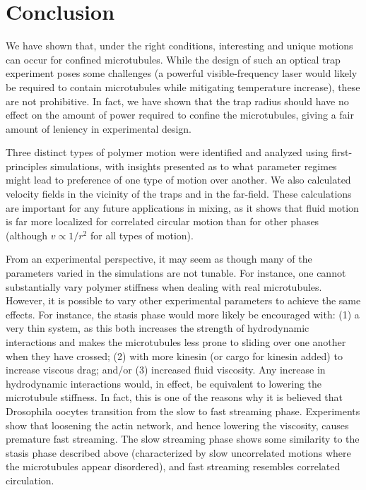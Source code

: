 \documentclass[11pt]{ucthesis}
\begin{document}
\section{Conclusion}

We have shown that, under the right conditions, interesting and unique motions can occur for confined microtubules. While the design of such an optical trap experiment poses some challenges (a powerful visible-frequency laser would likely be required to contain microtubules while mitigating temperature increase), these are not prohibitive. In fact, we have shown that the trap radius should have no effect on the amount of power required to confine the microtubules, giving a fair amount of leniency in experimental design.

Three distinct types of polymer motion were identified and analyzed using first-principles simulations, with insights presented as to what parameter regimes might lead to preference of one type of motion over another. We also calculated velocity fields in the vicinity of the traps and in the far-field. These calculations are important for any future applications in mixing, as it shows that fluid motion is far more localized for correlated circular motion than for other phases (although $v\propto 1/r^2$ for all types of motion).

From an experimental perspective, it may seem as though many of the parameters varied in the simulations are not tunable. For instance, one cannot substantially vary polymer stiffness when dealing with real microtubules. However, it is possible to vary other experimental parameters to achieve the same effects. For instance, the stasis phase would more likely be encouraged with: (1) a very thin system, as this both increases the strength of hydrodynamic interactions and makes the microtubules less prone to sliding over one another when they have crossed; (2) with more kinesin (or cargo for kinesin added) to increase viscous drag; and/or (3) increased fluid viscosity. Any increase in hydrodynamic interactions would, in effect, be equivalent to lowering the microtubule stiffness. In fact, this is one of the reasons why it is believed that Drosophila oocytes transition from the slow to fast streaming phase. Experiments \cite{serbus2005dynein} show that loosening the actin network, and hence lowering the viscosity, causes premature fast streaming. The slow streaming phase shows some similarity to the stasis phase described above (characterized by slow uncorrelated motions where the microtubules appear disordered), and fast streaming resembles correlated circulation.
\end{document}
